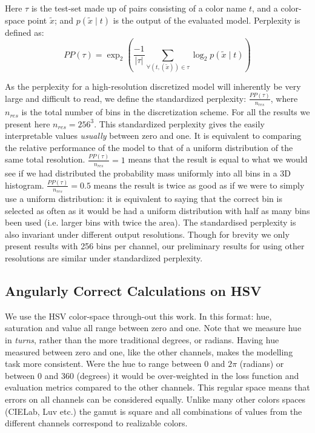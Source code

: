 \documentclass[]{clv3}
\newcommand{\parencite}{\citep}
\begin{document}
Here $\tau$ is the test-set made up of pairs consisting of a color name $t$, and a color-space point $\tilde{x}$;
and  $p(\tilde{x}\mid t)$ is the output of the evaluated model.
Perplexity is defined as:
\begin{equation}
PP(\tau) = \exp_2{\left(
	\frac{-1}{|\tau|} 
	\sum_{
		\forall(t,(\tilde{x})) \in \tau}
	\log_2 p(\tilde{x}\mid t)\right)}
\end{equation}

As the perplexity for a high-resolution discretized model will inherently be very large and difficult to read,
we define the standardized perplexity: $\frac{PP(\tau)}{n_{res}}$,
where $n_{res}$ is the total number of bins in the discretization scheme.
For all the results we present here $n_{res} = 256^3$.
This standardized perplexity gives the easily interpretable values \emph{usually} between zero and one.
It is equivalent to comparing the relative performance of the model to that of a uniform distribution of the same total resolution.
$\frac{PP(\tau)}{n_{res}}=1$ means that the result is equal to what we would see if we had distributed the probability mass uniformly into all bins in a 3D histogram.
$\frac{PP(\tau)}{n_{res}}=0.5$ means the result is twice as good as if we were to simply use a uniform distribution: it is equivalent to saying that the correct bin is selected as often as it would be had a uniform distribution with half as many bins been used (i.e. larger bins with twice the area).
The standardised perplexity is also invariant under different output resolutions.
Though for brevity we only  present results with 256 bins per channel, our preliminary results for using other resolutions are similar under standardized perplexity.


\subsection{Angularly Correct Calculations on HSV}\label{sec:angularly-correct}
We use the HSV color-space \parencite{smith1978color} through-out this work.
In this format: hue, saturation and value all range between zero and one.
Note that we measure hue in \emph{turns}, rather than the more traditional degrees, or radians.
Having hue measured between zero and one, like the other channels, makes the modelling task more consistent.
Were the hue to range between $0$ and $2\pi$ (radians) or between $0$ and $360$ (degrees) it would be over-weighted in the loss function and evaluation metrics compared to the other channels.
This regular space means that errors on all channels can be considered equally.
Unlike many other colors spaces (CIELab, Luv etc.) the gamut is square and all combinations of values from the different channels correspond to realizable colors.
\end{document}

